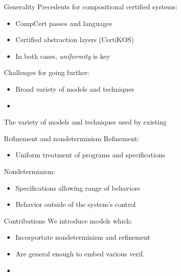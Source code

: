 \documentclass{beamer}
\begin{document}
\begin{frame}{Generality}
  Precedents for compositional certified systems:
  \begin{itemize}
    \item CompCert passes and languages
    \item Certified abstraction layers (CertiKOS)
    \item In both cases, \emph{uniformity} is key
  \end{itemize}

  Challenges for going further:
  \begin{itemize}
    \item Broad variety of models and techniques
    \item 
  \end{itemize}
  The variety of models and techniques used
  by existing 
\end{frame}

\begin{frame}{Refinement and nondeterminism}
  Refinement:
  \begin{itemize}
    \item Uniform treatment of programs and specifications
  \end{itemize}

  Nondeterminism:
  \begin{itemize}
    \item Specifications allowing range of behaviors
    \item Behavior outside of the system's control
  \end{itemize}
\end{frame}


\begin{frame}{Contributions}
  We introduce models which:
  \begin{itemize}
    \item Incorportate nondeterminism and refinement
    \item Are general enough to embed various verif.
    \item 
  \end{itemize}
\end{frame}

\end{document}
